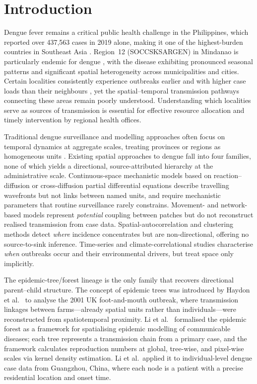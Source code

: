 \documentclass[a4paper,11pt]{article}
\begin{document}
\section{Introduction}
Dengue fever remains a critical public health challenge in the Philippines, which
reported over 437{,}563 cases in 2019 alone, making it one of the highest-burden
countries in Southeast Asia \cite{Ong2022,Undurraga2017}. Region~12
(SOCCSKSARGEN) in Mindanao is particularly endemic for dengue \cite{Bravo2014},
with the disease exhibiting pronounced seasonal patterns and significant spatial
heterogeneity across municipalities and cities. Certain localities consistently
experience outbreaks earlier and with higher case loads than their neighbours
\cite{Edillo2015}, yet the spatial--temporal transmission pathways connecting
these areas remain poorly understood. Understanding which localities serve as
sources of transmission is essential for effective resource allocation and timely
intervention by regional health offices.

Traditional dengue surveillance and modelling approaches often focus on temporal
dynamics at aggregate scales, treating provinces or regions as homogeneous units
\cite{Morales2019,Polwiang2020}. Existing spatial approaches to dengue fall into
four families, none of which yields a directional, source-attributed hierarchy at
the administrative scale. Continuous-space mechanistic models based on
reaction--diffusion or cross-diffusion partial differential equations
\cite{Maidana2007,Maidana2008,Aguiar2022,Triska2022} describe travelling
wavefronts but not links between named units, and require mechanistic parameters
that routine surveillance rarely constrains. Movement- and network-based models
\cite{Lezama2018,Lourenco2013} represent \emph{potential} coupling between
patches but do not reconstruct realised transmission from case data.
Spatial-autocorrelation and clustering methods \cite{Nakhapakorn2006} detect
\emph{where} incidence concentrates but are non-directional, offering no
source-to-sink inference. Time-series and climate-correlational studies
\cite{Morales2019,Polwiang2020} characterise \emph{when} outbreaks occur and
their environmental drivers, but treat space only implicitly.

The epidemic-tree/forest lineage is the only family that recovers directional
parent--child structure. The concept of epidemic trees was introduced by Haydon
et al.\ \cite{Haydon2003} to analyse the 2001 UK foot-and-mouth outbreak, where
transmission linkages between farms---already spatial units rather than
individuals---were reconstructed from spatiotemporal proximity. Li et al.\
\cite{Li2019} formalised the epidemic forest as a framework for spatialising
epidemic modelling of communicable diseases; each tree represents a transmission
chain from a primary case, and the framework calculates reproduction numbers at global, tree-wise, and pixel-wise scales via kernel density
estimation. Li et al.\ applied it to individual-level dengue case data from
Guangzhou, China, where each node is a patient with a precise residential
location and onset time.
\end{document}
